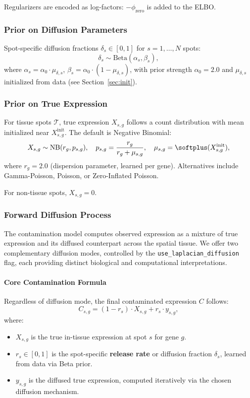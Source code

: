 \documentclass[11pt]{article}
\begin{document}
Regularizers are encoded as log-factors: $-\phi_{\text{zero}}$ is added to the ELBO.

\subsubsection{Prior on Diffusion Parameters}
Spot-specific diffusion fractions $\delta_s \in [0,1]$ for $s=1,\dots,N$ spots:
\[
\delta_s \sim \text{Beta}(\alpha_s, \beta_s),
\]
where $\alpha_s = \alpha_0 \cdot \mu_{\delta,s}$, $\beta_s = \alpha_0 \cdot (1 - \mu_{\delta,s})$, with prior strength $\alpha_0 = 2.0$ and $\mu_{\delta,s}$ initialized from data (see Section~\ref{sec:init}).

\subsubsection{Prior on True Expression}
For tissue spots $\mathcal{T}$, true expression $X_{s,g}$ follows a count distribution with mean initialized near $X^{\text{init}}_{s,g}$. The default is Negative Binomial:
\[
X_{s,g} \sim \text{NB}(r_g, p_{s,g}), \quad p_{s,g} = \frac{r_g}{r_g + \mu_{s,g}}, \quad \mu_{s,g} = \softplus(X^{\text{init}}_{s,g}),
\]
where $r_g = 2.0$ (dispersion parameter, learned per gene). Alternatives include Gamma-Poisson, Poisson, or Zero-Inflated Poisson.

For non-tissue spots, $X_{s,g} = 0$.

\subsubsection{Forward Diffusion Process}

The contamination model computes observed expression as a mixture of true expression and its diffused counterpart across the spatial tissue. We offer two complementary diffusion modes, controlled by the \texttt{use\_laplacian\_diffusion} flag, each providing distinct biological and computational interpretations.

\paragraph{Core Contamination Formula}

Regardless of diffusion mode, the final contaminated expression $C$ follows:
\[
C_{s,g} = (1 - r_s) \cdot X_{s,g} + r_s \cdot y_{s,g},
\]
where:
\begin{itemize}
  \item $X_{s,g}$ is the true in-tissue expression at spot $s$ for gene $g$.
  \item $r_s \in [0, 1]$ is the spot-specific \textbf{release rate} or diffusion fraction $\delta_s$, learned from data via Beta prior.
  \item $y_{s,g}$ is the diffused true expression, computed iteratively via the chosen diffusion mechanism.
\end{itemize}
\end{document}
